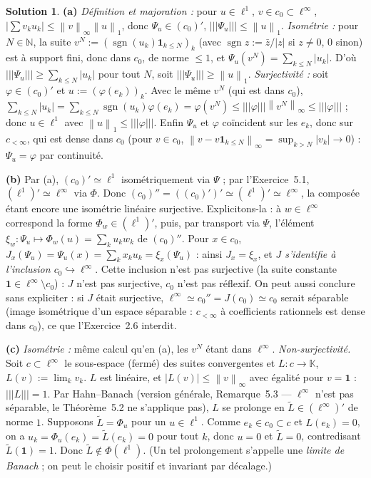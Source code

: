 \documentclass[11pt,a4paper]{article}
\newcommand{\N}{\mathbb{N}}
\newcommand{\K}{\mathbb{K}}
\newcommand{\norm}[1]{\left\|#1\right\|}
\newcommand{\opnorm}[1]{|\!|\!|#1|\!|\!|}
\DeclareMathOperator{\sgn}{sgn}
\theoremstyle{definition}
\newtheorem*{solution}{Solution}
\begin{document}
\begin{solution}
\noindent\textbf{(a)} \emph{Définition et majoration :} pour $u\in\ell^1$, $v\in c_0\subset\ell^\infty$, $|\sum v_ku_k|\le\norm v_\infty\norm u_1$, donc $\Psi_u\in(c_0)'$, $\opnorm{\Psi_u}\le\norm u_1$. \emph{Isométrie :} pour $N\in\N$, la suite $v^N:=(\sgn(u_k)\mathbf 1_{k\le N})_k$ (avec $\sgn z:=\bar z/|z|$ si $z\ne0$, $0$ sinon) est à support fini, donc dans $c_0$, de norme $\le1$, et $\Psi_u(v^N)=\sum_{k\le N}|u_k|$. D'où $\opnorm{\Psi_u}\ge\sum_{k\le N}|u_k|$ pour tout $N$, soit $\opnorm{\Psi_u}\ge\norm u_1$. \emph{Surjectivité :} soit $\varphi\in(c_0)'$ et $u:=(\varphi(e_k))_k$. Avec le même $v^N$ (qui est dans $c_0$), $\sum_{k\le N}|u_k|=\sum_{k\le N}\sgn(u_k)\varphi(e_k)=\varphi(v^N)\le\opnorm\varphi\norm{v^N}_\infty\le\opnorm\varphi$ ; donc $u\in\ell^1$ avec $\norm u_1\le\opnorm\varphi$. Enfin $\Psi_u$ et $\varphi$ coïncident sur les $e_k$, donc sur $c_{<\infty}$, qui est dense dans $c_0$ (pour $v\in c_0$, $\norm{v-v\mathbf 1_{k\le N}}_\infty=\sup_{k>N}|v_k|\to0$) : $\Psi_u=\varphi$ par continuité.

\medskip
\noindent\textbf{(b)} Par (a), $(c_0)'\simeq\ell^1$ isométriquement via $\Psi$ ; par l'Exercice~5.1, $(\ell^1)'\simeq\ell^\infty$ via $\Phi$. Donc $(c_0)''=((c_0)')'\simeq(\ell^1)'\simeq\ell^\infty$, la composée étant encore une isométrie linéaire surjective. Explicitons-la : à $w\in\ell^\infty$ correspond la forme $\Phi_w\in(\ell^1)'$, puis, par transport via $\Psi$, l'élément $\xi_w:\Psi_u\mapsto\Phi_w(u)=\sum_ku_kw_k$ de $(c_0)''$. Pour $x\in c_0$, $J_x(\Psi_u)=\Psi_u(x)=\sum_kx_ku_k=\xi_x(\Psi_u)$ : ainsi $J_x=\xi_x$, et \emph{$J$ s'identifie à l'inclusion $c_0\hookrightarrow\ell^\infty$}. Cette inclusion n'est pas surjective (la suite constante $\mathbf 1\in\ell^\infty\setminus c_0$) : $J$ n'est pas surjective, $c_0$ n'est pas réflexif. On peut aussi conclure sans expliciter : si $J$ était surjective, $\ell^\infty\simeq c_0''=J(c_0)\simeq c_0$ serait séparable (image isométrique d'un espace séparable : $c_{<\infty}$ à coefficients rationnels est dense dans $c_0$), ce que l'Exercice~2.6 interdit.

\medskip
\noindent\textbf{(c)} \emph{Isométrie :} même calcul qu'en (a), les $v^N$ étant dans $\ell^\infty$. \emph{Non-surjectivité.} Soit $c\subset\ell^\infty$ le sous-espace (fermé) des suites convergentes et $L:c\to\K$, $L(v):=\lim_kv_k$. $L$ est linéaire, et $|L(v)|\le\norm v_\infty$ avec égalité pour $v=\mathbf 1$ : $\opnorm L=1$. Par Hahn--Banach (version générale, Remarque~5.3 — $\ell^\infty$ n'est pas séparable, le Théorème~5.2 ne s'applique pas), $L$ se prolonge en $\tilde L\in(\ell^\infty)'$ de norme $1$. Supposons $\tilde L=\Phi_u$ pour un $u\in\ell^1$. Comme $e_k\in c_0\subset c$ et $L(e_k)=0$, on a $u_k=\Phi_u(e_k)=\tilde L(e_k)=0$ pour tout $k$, donc $u=0$ et $\tilde L=0$, contredisant $\tilde L(\mathbf 1)=1$. Donc $\tilde L\notin\Phi(\ell^1)$. (Un tel prolongement s'appelle une \emph{limite de Banach} ; on peut le choisir positif et invariant par décalage.)


\end{solution}
\end{document}
